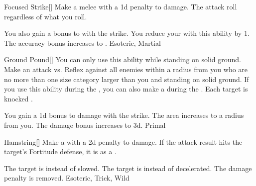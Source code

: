 \lowercase{\hypertarget{maneuver:Focused Strike}{}}\label{maneuver:Focused Strike}
\hypertarget{maneuver:Focused Strike}{}
\begin{freeability}{Focused Strike}[]
Make a melee  with a \minus1d penalty to damage.
The attack roll  regardless of what you roll.

\rankline
{} You also gain a  bonus to  with the strike.
 You reduce your  with this ability by 1.
 The accuracy bonus increases to .
 Esoteric, Martial
\end{freeability}
\vspace{0.25em}



\lowercase{\hypertarget{maneuver:Ground Pound}{}}\label{maneuver:Ground Pound}
\hypertarget{maneuver:Ground Pound}{}
\begin{freeability}{Ground Pound}[]
You can only use this ability while standing on solid ground.
Make an attack vs. Reflex against all enemies within a \areasmall radius from you who are no more than one size category larger than you and standing on solid ground.
If you use this ability during the , you can also make a  during the .
\hit Each target is knocked \prone.

\rankline
{} You gain a \plus1d bonus to damage with the strike.
 The area increases to a \arealarge radius from you.
 The damage bonus increases to \plus3d.
 Primal
\end{freeability}
\vspace{0.25em}



\lowercase{\hypertarget{maneuver:Hamstring}{}}\label{maneuver:Hamstring}
\hypertarget{maneuver:Hamstring}{}
\begin{freeability}{Hamstring}[]
Make a  with a \minus2d penalty to damage.
If the attack result hits the target's Fortitude defense,
it is  as a .

\rankline
{} The target is  instead of slowed.
 The target is  instead of decelerated.
 The damage penalty is removed.
 Esoteric, Trick, Wild
\end{freeability}
\vspace{0.25em}



